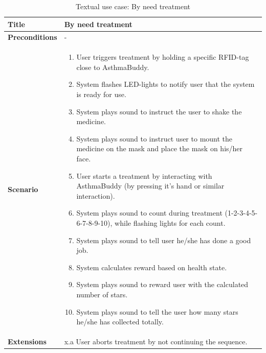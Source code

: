 \begin{table}[H]
\centering
\begin{tabular}{|p{4.0cm} | p{9.0cm} |}
\hline
\textbf{Title} & By need treatment \\
\hline
\textbf{Preconditions} & - \\
\hline 
\textbf{Scenario} & 
	\begin{enumerate}
	  \itemsep0em
	  \item User triggers treatment by holding a specific RFID-tag close to AsthmaBuddy.
	  \item System flashes LED-lights to notify user that the system is ready for use.
	  \item System plays sound to instruct the user to shake the medicine.
	  \item System plays sound to instruct user to mount the medicine on the mask and place the mask on his/her face.
	  \item User starts a treatment by interacting with AsthmaBuddy (by pressing it's hand or similar interaction).
	  \item System plays sound to count during treatment (1-2-3-4-5-6-7-8-9-10), while flashing lights for each count.
	  \item System plays sound to tell user he/she has done a good job.
	  \item System calculates reward based on health state.
	  \item System plays sound to reward user with the calculated number of stars.
	  \item System plays sound to tell the user how many stars he/she has collected totally.
	\end{enumerate}
\\
\hline
	\textbf{Extensions} & 
		x.a User aborts treatment by not continuing the sequence.
\\
\hline
\end{tabular}
\caption{Textual use case: By need treatment}
\label{tab:textual-use-case}
\end{table}



